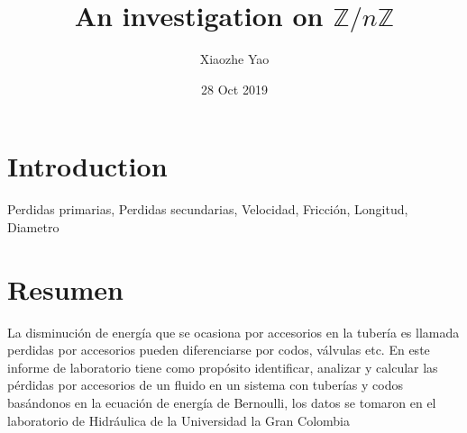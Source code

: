 \documentclass{article}
\title{An investigation on $\mathbb{Z}/n\mathbb{Z}$}
\author{Xiaozhe Yao}
\date{28 Oct 2019}
\begin{document}
\maketitle
\section{Introduction}
Perdidas primarias, Perdidas secundarias, Velocidad, Fricción, Longitud, Diametro

\section{Resumen}
La disminución de energía que se ocasiona  por accesorios en la tubería es llamada perdidas por accesorios pueden diferenciarse por codos, válvulas etc. En este informe de laboratorio tiene como propósito identificar, analizar y calcular las pérdidas por accesorios de un fluido en un sistema con tuberías y codos basándonos en la ecuación de energía de Bernoulli, los datos se tomaron en el laboratorio de Hidráulica de la Universidad la Gran Colombia
\end{document}
